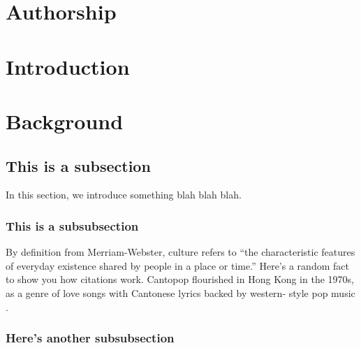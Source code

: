 \documentclass[a4paper, 12pt, american]{article}
\begin{document}
\lipsum[3]

\newpage

\section*{Authorship}

\lipsum[3]

\newpage
\singlespacing %

\tableofcontents

\listoffigures

\listoftables

\newpage
\onehalfspacing %
\section{Introduction}

\lipsum[8]

\newpage

\section{Background}

\subsection{This is a subsection}

In this section, we introduce something blah blah blah.

\subsubsection{This is a subsubsection}

By definition from Merriam-Webster, culture refers to ``the characteristic
features of everyday existence shared by people in a place or time.'' Here's
a random fact to show you how citations work. Cantopop flourished in Hong Kong
in the 1970s, as a genre of love songs with Cantonese lyrics backed by western-
style pop music \parencite{carroll2007}.

\lipsum[1]

\subsubsection{Here's another subsubsection}
\end{document}
